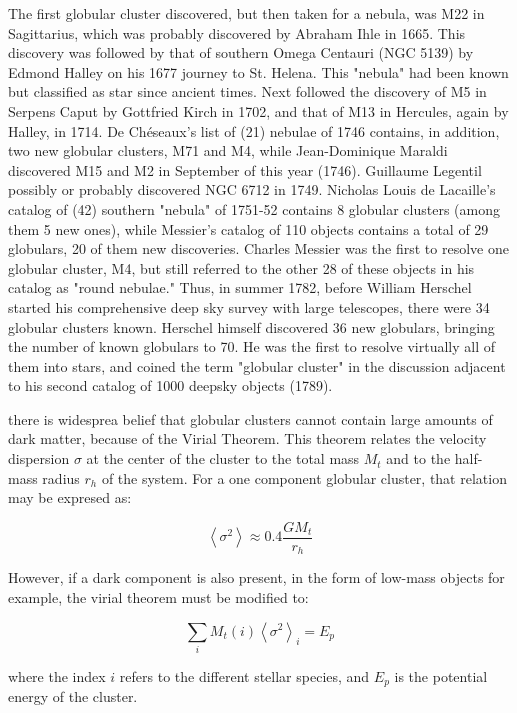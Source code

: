 The first globular cluster discovered, but then taken for a nebula, was M22 in Sagittarius, which was probably discovered by Abraham Ihle in 1665. This discovery was followed by that of southern Omega Centauri (NGC 5139) by Edmond Halley on his 1677 journey to St. Helena. This "nebula" had been known but classified as star since ancient times. Next followed the discovery of M5 in Serpens Caput by Gottfried Kirch in 1702, and that of M13 in Hercules, again by Halley, in 1714. De Chéseaux's list of (21) nebulae of 1746 contains, in addition, two new globular clusters, M71 and M4, while Jean-Dominique Maraldi discovered M15 and M2 in September of this year (1746). Guillaume Legentil possibly or probably discovered NGC 6712 in 1749. Nicholas Louis de Lacaille's catalog of (42) southern "nebula" of 1751-52 contains 8 globular clusters (among them 5 new ones), while Messier's catalog of 110 objects contains a total of 29 globulars, 20 of them new discoveries. Charles Messier was the first to resolve one globular cluster, M4, but still referred to the other 28 of these objects in his catalog as "round nebulae." Thus, in summer 1782, before William Herschel started his comprehensive deep sky survey with large telescopes, there were 34 globular clusters known. Herschel himself discovered 36 new globulars, bringing the number of known globulars to 70. He was the first to resolve virtually all of them into stars, and coined the term "globular cluster" in the discussion adjacent to his second catalog of 1000 deepsky objects (1789).


there is  widesprea belief that globular clusters cannot contain large amounts of dark matter, because of the Virial Theorem. This theorem relates the velocity dispersion $ \sigma $ at the center of the cluster to the total mass $M_{t}$ and to the half-mass radius $r_{h}$ of the system. For a one component globular cluster, that relation may be expresed as:

\begin{equation}
\left\langle \sigma^{2}\right\rangle \approx0.4\frac{GM_{t}}{r_{h}}
\end{equation}

However, if a dark component is also present, in the form of low-mass objects for example, the virial theorem must be modified to:

\begin{equation}
\sum_{i}M_{t}(i)\left\langle \sigma^{2}\right\rangle _{i}=E_{p}
\end{equation}

where the index $i$ refers to the different stellar species, and $E_{p}$ is the potential energy of the cluster.

